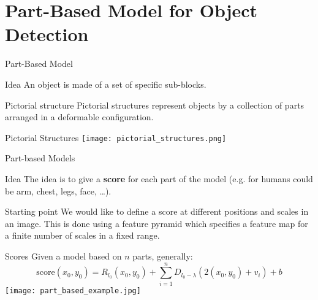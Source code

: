 \begin{frame}[plain]
\end{frame}

\section{Part-Based Model for Object Detection}

\begin{frame}{Part-Based Model}
  \begin{block}{Idea}
    An object is made of a set of specific sub-blocks.
  \end{block}
  \pause
  \begin{block}{Pictorial structure}
    Pictorial structures represent objects by a collection of parts arranged in
    a deformable configuration.
  \end{block}
\end{frame}


\begin{frame}{Pictorial Structures}
  \centering
  \texttt{[image: pictorial\_structures.png]}
\end{frame}

\begin{frame}{Part-based Models}
  \begin{exampleblock}{Idea}
    The idea is to give a \textbf{score} for each part of the model (e.g. for
    humans could be arm, chest, legs, face, \dots).
  \end{exampleblock}
  \pause
  \begin{alertblock}{Starting point}
    We would like to define a score at different positions and scales in an image.
    This is done using a feature pyramid which specifies a feature map for a finite
    number of scales in a fixed range.
  \end{alertblock}
\end{frame}

\begin{frame}{Scores}
  Given a model based on $n$ parts, generally:
  \begin{equation*}
  \mbox{score}(x_0,y_0) = R_{l_0}(x_0, y_0) + \sum_{i=1}^nD_{l_0-\lambda}(2(x_0,y_0)+v_i)+b
  \end{equation*}
  \texttt{[image: part\_based\_example.jpg]}
\end{frame}
